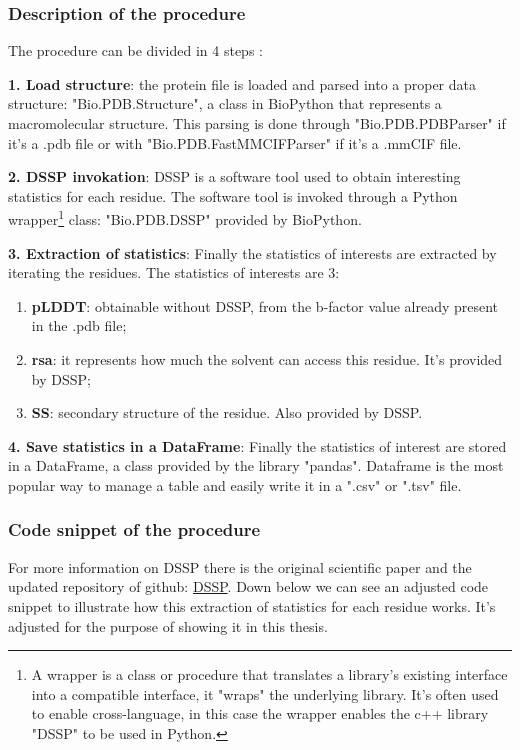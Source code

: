 \subsubsection{Description of the procedure}
The procedure can be divided in 4 steps :
\begin{description}
    \item \textbf{1. Load structure}: the protein file is loaded and parsed into a proper data structure: "Bio.PDB.Structure", a class in BioPython that represents a macromolecular structure. This parsing is done through "Bio.PDB.PDBParser" if it's a .pdb file or with "Bio.PDB.FastMMCIFParser" if it's a .mmCIF file.
    
    \item \textbf{2. DSSP invokation}: DSSP is a software tool used to obtain interesting statistics for each residue. The software tool is invoked through a Python wrapper\footnote{A wrapper is a class or procedure that translates a library's existing interface into a compatible interface, it "wraps" the underlying library. It's often used to enable cross-language, in this case the wrapper enables the c++ library "DSSP" to be used in Python.} class: "Bio.PDB.DSSP" provided by BioPython. 
    
    \item \textbf{3. Extraction of statistics}: Finally the statistics of interests are extracted by iterating the residues. The statistics of interests are 3: 
    \begin{enumerate}
        \item \textbf{pLDDT}: obtainable without DSSP, from the b-factor value already present in the .pdb file;
        \item \textbf{rsa}: it represents how much the solvent can access this residue. It's provided by DSSP;
        \item \textbf{SS}: secondary structure of the residue. Also provided by DSSP.
    \end{enumerate}
    
    
    \item \textbf{4. Save statistics in a DataFrame}: Finally the statistics of interest are stored in a DataFrame, a class provided by the library "pandas". Dataframe is the most popular way to manage a table and easily write it in a ".csv" or ".tsv" file. 
\end{description}


\subsubsection{Code snippet of the procedure}
For more information on DSSP there is the original scientific paper \cite{og-dssp} and the updated repository of github: \hyperlink{https://github.com/PDB-REDO/dssp}{DSSP}.
Down below we can see an adjusted code snippet to illustrate how this extraction of statistics for each residue works. It's adjusted for the purpose of showing it in this thesis.

